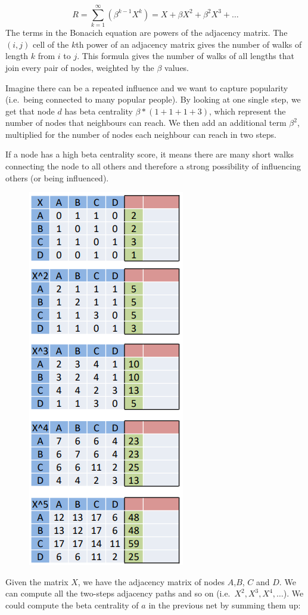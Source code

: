 \documentclass[
  notitlepage,
  onecolumn,
  openany]{book}
\begin{document}
\[
R = \sum^\infty_{k=1}(\beta^{k-1}X^k) = X+\beta X^2+\beta^2 X^3+\dots
\]
The terms in the Bonacich equation are powers of the adjacency matrix. The \((i,j)\) cell of the \(k\)th power of an adjacency matrix gives the number of walks of length \(k\) from \(i\) to \(j\). This formula gives the number of walks of all lengths that join every pair of nodes, weighted by the \(\beta\) values.

Imagine there can be a repeated influence and we want to capture popularity (i.e.~being connected to many popular people). By looking at one single step, we get that node \(d\) has beta centrality \(\beta*(1+1+1+3)\), which represent the number of nodes that neighbours can reach. We then add an additional term \(\beta^2\), multiplied for the number of nodes each neighbour can reach in two steps.

If a node has a high beta centrality score, it means there are many short walks connecting the node to all others and therefore a strong possibility of influencing others (or being influenced).

\begin{figure}[h!]

{\centering \includegraphics[width=0.3\linewidth]{images/05-Matrices and Beta centrality/Untitled 4} 

}

\end{figure}

Given the matrix \(X\), we have the adjacency matrix of nodes \(A\),\(B\), \(C\) and \(D\). We can compute all the two-steps adjacency paths and so on (i.e.~\(X^2, X^3, X^4,\dots\)). We could compute the beta centrality of \(a\) in the previous net by summing them up:
\end{document}
